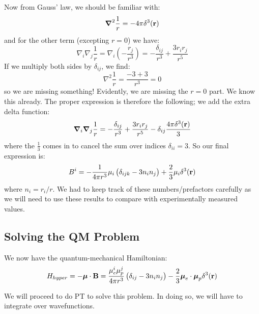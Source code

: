 Now from Gauss' law, we should be familiar with:
\begin{equation}
    \nabla^2 \frac{1}{r} = -4\pi \delta^3(\v{r})
\end{equation}
and for the other term (excepting $r = 0$) we have:
\begin{equation}
    \nabla_i\nabla_j\frac{1}{r} = \nabla_i\left(-\frac{r_j}{r^3}\right) = -\frac{\delta_{ij}}{r^3} + \frac{3r_ir_j}{r^5}
\end{equation}
If we multiply both sides by $\delta_{ij}$, we find:
\begin{equation}
    \nabla^2 \frac{1}{r} = \frac{-3 + 3}{r^3} = 0
\end{equation}
so we are missing something! Evidently, we are missing the $r = 0$ part. We know this already. The proper expression is therefore the following; we add the extra delta function:
\begin{equation}
    \nabla_i\nabla_j\frac{1}{r} = -\frac{\delta_{ij}}{r^3} + \frac{3r_ir_j}{r^5} - \delta_{ij}\frac{4\pi\delta^3(\v{r})}{3}
\end{equation}
where the $\frac{1}{3}$ comes in to cancel the sum over indices $\delta_{ii} = 3$. So our final expression is:
\begin{equation}
    B^i = -\frac{1}{4\pi r^3}\mu_i\left(\delta_{ijk} - 3n_in_j\right) + \frac{2}{3}\mu_i\delta^3(\mathbf{r})
\end{equation}
where $n_i = r_i/r$. We had to keep track of these numbers/prefactors carefully as we will need to use these results to compare with experimentally measured values.

\subsection{Solving the QM Problem}
We now have the quantum-mechanical Hamiltonian:
\begin{equation}
    H_{hyper} = -\mbox{\boldmath$ \mu $} \cdot \mathbf{B} = \frac{\mu_e^i\mu_p^j}{4\pi r^3}\left(\delta_{ij} - 3n_in_j\right) - \frac{2}{3}\mbox{\boldmath$ \mu $}_e \cdot \mbox{\boldmath$ \mu $}_p \delta^3(\mathbf{r})
\end{equation}

We will proceed to do PT to solve this problem. In doing so, we will have to integrate over wavefunctions. 

